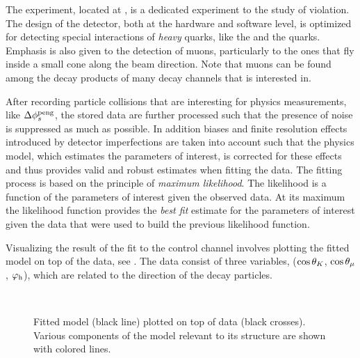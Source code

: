The \lhcb experiment, located at \cern, is a dedicated experiment to the study of \CP violation.
The design of the detector, both at the hardware and software level, is optimized for detecting
special interactions of {\it heavy} quarks, like the \bquark and the \cquark quarks.
Emphasis is also given to the detection of muons, particularly to the ones that fly
inside a small cone along the beam direction. Note that muons can be found among the decay
products of many decay channels that \lhcb is interested in.

After recording particle collisions that are interesting for physics measurements, like $\Delta\phi_{s}^{\tiny\text{peng}}$,
the stored data are further processed such that the presence of noise is suppressed as much
as possible. In addition biases and finite resolution effects introduced by detector imperfections are
taken into account such that the physics model, which estimates the parameters of interest, is
corrected for these effects and thus provides valid and robust estimates when fitting the data.
The fitting process is based on the principle of {\it maximum likelihood}.
The likelihood is a function of the parameters of interest given the observed data.
At its maximum the likelihood function provides the {\it best fit} estimate for the parameters
of interest given the data that were used to build the previous likelihood function.

Visualizing the result of the fit to the \BsJpsiKst control channel involves plotting the fitted model on top of the data,
see . The data consist of three variables,
($\cos\theta_{K}$, $\cos\theta_{\mu}$, $\varphi_{\rm h}$), which are related to the direction of the \BsJpsiKst decay particles.

\begin{figure}[!t]
  \begin{subfigure}{0.5\textwidth}
    \centering
    \scalebox{1.2}{}
  \end{subfigure}%
  \hfill
  \begin{subfigure}{0.5\textwidth}
    \centering
    \scalebox{1.2}{}
  \end{subfigure}\\
  \begin{subfigure}{\textwidth}
    \centering
    \scalebox{1.2}{}
  \end{subfigure}
  \caption{Fitted model (black line) plotted on top of \BsJpsiKst data (black crosses).
           Various components of the model relevant to its \CP structure are shown with colored lines.}
  \label{app_angular_plot_thetas}
\end{figure}

